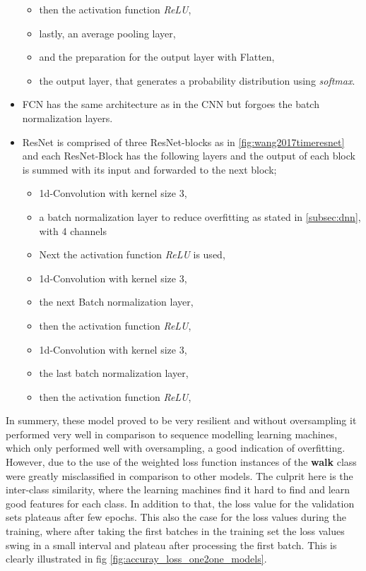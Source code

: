 \begin{itemize}
\begin{itemize}
					\item then the activation function \textit{ReLU},
					\item lastly, an average pooling layer,
					\item and the preparation for the output layer with Flatten,
					\item the output layer, that generates a probability distribution using \textit{softmax}.
				\end{itemize}
			\item FCN has the same architecture as in the CNN but forgoes the batch normalization layers.
			\item ResNet is comprised of three ResNet-blocks as in \ref{fig:wang2017timeresnet} and each ResNet-Block has the following layers and the output of each block is summed with its input and forwarded to the next block;
				\begin{itemize}
					\item 1d-Convolution with kernel size 3,
					\item a batch normalization layer to reduce overfitting as stated in \ref{subsec:dnn}, with 4 channels
					\item Next the activation function \textit{ReLU} is used,
					\item 1d-Convolution with kernel size 3,
					\item the next Batch normalization layer,
					\item then the activation function \textit{ReLU},
					\item 1d-Convolution with kernel size 3,
					\item the last batch normalization layer,
					\item then the activation function \textit{ReLU},
				\end{itemize}
		\end{itemize}
		In summery, these model proved to be very resilient and without oversampling it performed very well in comparison to sequence modelling learning machines, which only performed well with oversampling, a good indication of overfitting. However, due to the use of the weighted loss function instances of the \textbf{walk} class were greatly misclassified in comparison to other models. The culprit here is the inter-class similarity, where the learning machines find it hard to find and learn good features for each class. In addition to that, the loss value for the validation sets plateaus after few epochs. This also the case for the loss values during the training, where after taking the first batches in the training set the loss values swing in a small interval and plateau after processing the first batch. This is clearly illustrated in fig \ref{fig:accuray_loss_one2one_models}.\newline
